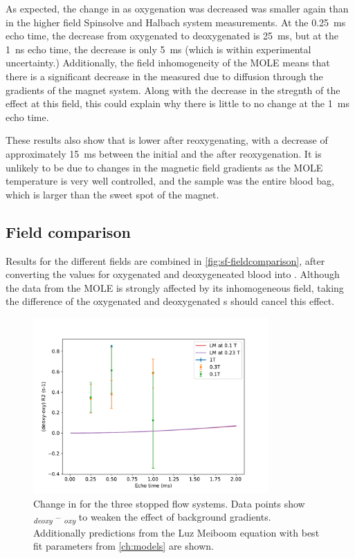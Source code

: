 As expected, the change in \Ttwo as oxygenation was decreased was smaller again than in the higher field Spinsolve and Halbach system measurements.
At the \SI{0.25}{ms} echo time, the decrease from oxygenated to deoxygenated is \SI{25}{ms}, but at the \SI{1}{ns} echo time, the decrease is only \SI{5}{ms} (which is within experimental uncertainty.)
Additionally, the field inhomogeneity of the MOLE means that there is a significant decrease in the measured \Ttwo due to diffusion through the gradients of the magnet system.
Along with the decrease in the stregnth of the effect at this field, this could explain why there is little to no change at the \SI{1}{ms} echo time.

These results also show that \Ttwo is lower after reoxygenating, with a decrease of approximately \SI{15}{ms} between the initial \Ttwo and the \Ttwo after reoxygenation.
It is unlikely to be due to changes in the magnetic field gradients as the MOLE temperature is very well controlled, and the sample was the entire blood bag, which is larger than the sweet spot of the magnet.

\subsection{Field comparison}
Results for the different fields are combined in \autoref{fig:sf-fieldcomparison}, after converting the \Ttwo values for oxygenated and deoxygeneated blood into \Rtwo.
Although the data from the MOLE is strongly affected by its inhomogeneous field, taking the difference of the oxygenated and deoxygenated \Rtwo{}s should cancel this effect.

\begin{figure}[h]
\centering
\includegraphics[width=0.8\textwidth]{figures/stoppedflow/fieldcomparison.pdf}
\caption[Change in \Rtwo for the three stopped flow systems]{Change in \Rtwo for the three stopped flow systems. Data points show \Rtwo\textsubscript{\textit{deoxy}} -- \Rtwo\textsubscript{\textit{oxy}} to weaken the effect of background gradients. Additionally predictions from the Luz Meiboom equation with best fit parameters from \autoref{ch:models} are shown.}
\label{fig:sf-fieldcomparison}
\end{figure}

